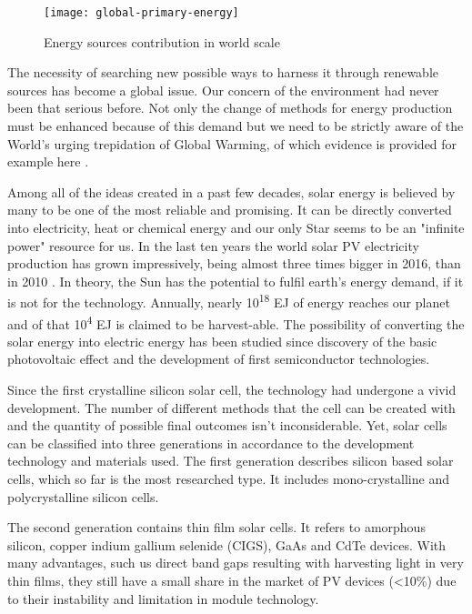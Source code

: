 \begin{figure}[H]
\centering
\texttt{[image: global-primary-energy]}
\caption{Energy sources contribution in world scale
\cite{2019}}
\label{fig:ensour}
\end{figure}

\noindent The necessity of searching new possible ways to harness it through renewable sources has become a global issue. Our concern of the environment had never been that serious before. Not only the change of methods for energy production must be enhanced because of this demand but we need to be strictly aware of the World's urging trepidation of Global Warming, of which evidence is provided for example here \cite{Nasa2019}.

\noindent Among all of the ideas created in a past few decades, solar energy is
believed by many to be one of the most reliable and promising. It can be
directly converted into electricity, heat or chemical energy and our
only Star seems to be an "infinite power" resource for us. In the last ten
years the world solar PV electricity production has grown impressively,
being almost three times bigger in 2016, than in 2010 \cite{2018}. In theory,
the Sun has the potential to fulfil earth's energy demand, if it is not
for the technology. Annually, nearly 10\textsuperscript{18} EJ of energy
reaches our planet and of that 10\textsuperscript{4} EJ is claimed to be
harvest-able. The possibility of converting the solar energy into
electric energy has been studied since discovery of the basic
photovoltaic effect and the development of first semiconductor technologies.

Since the first crystalline silicon solar cell, the technology had undergone a vivid development. The number of different methods that the cell can be created with and the quantity of possible final outcomes isn't inconsiderable. Yet, solar cells can be classified into three generations in accordance to the development technology and materials used\cite{HuashangRao2018}. The first generation describes silicon based solar cells, which so far is the most researched type. It includes mono-crystalline and polycrystalline silicon cells.

The second generation contains thin film solar cells. It refers to amorphous silicon, copper indium gallium selenide (CIGS), GaAs and CdTe devices. With many advantages, such us direct band gaps resulting with harvesting light in very thin films, they still have a small share in the market of PV devices (<10\%) due to their instability and limitation in module technology\cite{HuashangRao2018}.

